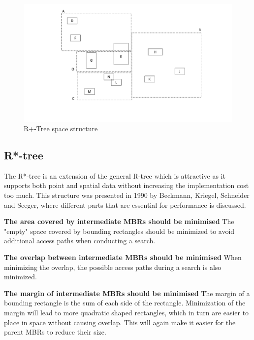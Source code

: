 \begin{figure}[ht]
    \centering
    \includegraphics[scale=0.3]{figures/RPlusTree_space.pdf}
    \caption{R+-Tree space structure}
    \label{fig:RplusTreeSpace}
\end{figure}

\subsection{R*-tree}
The R*-tree is an extension of the general R-tree which is attractive as it supports both point and spatial data without increasing the implementation cost too much. This structure was presented in 1990 by Beckmann, Kriegel, Schneider and Seeger\cite{R*-tree}, where different parts that are essential for performance is discussed.

\noindent
\textbf{The area covered by intermediate MBRs should be minimised}\newline
The "empty" space covered by bounding rectangles should be minimized to avoid additional access paths when conducting a search. \newline

\noindent
\textbf{The overlap between intermediate MBRs should be minimised}\newline
When minimizing the overlap, the possible access paths during a search is also minimized. \newline

\noindent
\textbf{The margin of intermediate MBRs should be minimised}\newline
The margin of a bounding rectangle is the sum of each side of the rectangle. Minimization of the margin will lead to more quadratic shaped rectangles, which in turn are easier to place in space without causing overlap. This will again make it easier for the parent MBRs to reduce their size. \newline

